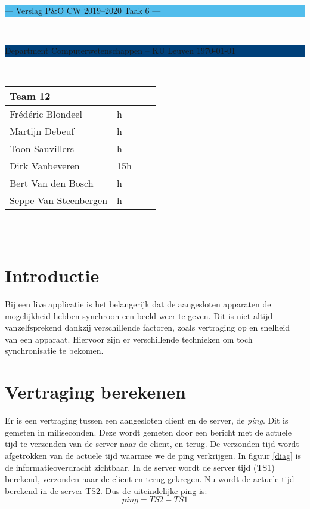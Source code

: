\documentclass[a4paper,11pt]{article}
\begin{document}
  \noindent
  \colorbox[HTML]{52BDEC}{\bfseries\parbox{\textwidth}{\centering\large
  --- Verslag P\&O CW 2019--2020 Taak 6 ---
  }}
  \\[-1mm]
  \colorbox[HTML]{00407A}{\bfseries\color{white}\parbox{\textwidth}{
  Department Computerwetenschappen -- KU Leuven
  \hfill
  \today
  }}
  \\

  \smallskip

  \noindent

  \begin{tabular}{*4l}
    \toprule
    \multicolumn{2}{l}{\large\textbf{Team 12}} \\
    \midrule
    Frédéric Blondeel & h \\
    Martijn Debeuf & h \\
    Toon Sauvillers & h \\ %
    Dirk Vanbeveren & 15h \\
    Bert Van den Bosch & h \\
    Seppe Van Steenbergen & h \\


    \bottomrule
    \hline
  \end{tabular}\\

  \noindent
  {\color[HTML]{52BDEC} \rule{\linewidth}{1mm} }
  \tableofcontents
  \newpage
  \section{Introductie}\label{sec:introductie}

  Bij een live applicatie is het belangerijk dat de aangesloten apparaten de mogelijkheid hebben synchroon een beeld weer te geven. Dit is niet altijd vanzelfsprekend dankzij verschillende factoren, zoals vertraging op en snelheid van een apparaat. Hiervoor zijn er verschillende technieken om toch synchronisatie te bekomen.

  \section{Vertraging berekenen}
  Er is een vertraging tussen een aangesloten client en de server, de {\it ping}. Dit is gemeten in miliseconden.
  Deze wordt gemeten door een bericht met de actuele tijd te verzenden van de server naar de client, en terug. De verzonden tijd wordt afgetrokken van de actuele tijd waarmee we de ping verkrijgen.
  In figuur \ref{diag} is de informatieoverdracht zichtbaar. In de server wordt de server tijd (TS1) berekend, verzonden naar de client en terug gekregen.
  Nu wordt de actuele tijd berekend in de server TS2. Dus de uiteindelijke ping is:
  \[ping = TS2 - TS1\]
\end{document}
